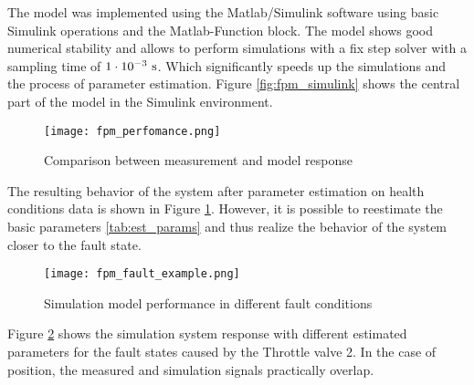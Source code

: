 The model was implemented using the Matlab/Simulink software using basic
Simulink operations and the Matlab-Function block. The model shows good
numerical stability and allows to perform simulations with a fix step
solver with a sampling time of $1\cdot 10^{-3} \rm\ s$. Which significantly speeds up the
simulations and the process of parameter estimation. Figure
\ref{fig:fpm_simulink} shows
the central part of the model in the Simulink environment.

\begin{figure}[!ht]
    \centering
    \texttt{[image: fpm\_perfomance.png]}
    \caption{Comparison between measurement and model response}
    \label{fig:fpm_perfomance}
\end{figure}

The resulting behavior of the system after parameter estimation on health
conditions data is shown in Figure \ref{fig:fpm_perfomance}. However, it is
possible to reestimate the basic parameters \ref{tab:est_params} and thus
realize the behavior of the system closer to the fault state.

\begin{figure}[!ht]
    \centering
    \texttt{[image: fpm\_fault\_example.png]}
    \caption{Simulation model performance in different fault conditions}
    \label{fig:fpm_fault_example}
\end{figure}

\newpage
Figure \ref{fig:fpm_fault_example} shows the simulation system
response with different estimated parameters for the fault states caused by
the Throttle valve 2. In the case of position, the measured and simulation
signals practically overlap.




